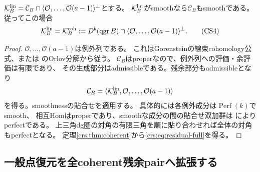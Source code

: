 \begin{proposition}[残余のsmoothnessから全線束部分へ]
\label{crs:prop:residual-smooth}
$\mathcal K_B^{\rm lin}=\mathcal C_B\cap
\langle\mathcal O,\ldots,\mathcal O(a-1)\rangle^\perp$とする。
$\mathcal K_B^{\rm lin}$がsmoothなら$\mathcal C_B$もsmoothである。
従ってこの場合
\[
 \mathcal K_B^{\rm lin}=\mathcal K_B^{\rm coh}:=
 D^b(\operatorname{qgr}B)\cap
 \langle\mathcal O,\ldots,\mathcal O(a-1)\rangle^\perp.
 \tag{CS4}\label{crs:eq:residual-full}
\]
\end{proposition}
\begin{proof}
$\mathcal O,\ldots,\mathcal O(a-1)$は例外列である。
これはGorensteinの線束cohomology公式、または
\cite[Theorem~6.4]{CRSBS}のOrlov分解から従う。
$\mathcal C_B$はproperなので、例外列への評価・余評価は有限であり、
その生成部分はadmissibleである。残余部分もadmissibleとなり
\[
 \mathcal C_B=\langle\mathcal K_B^{\rm lin},
                 \mathcal O,\ldots,\mathcal O(a-1)\rangle
\]
を得る。smoothnessの貼合せ\cite[Lemma~4.15(3)]{CRSPerry}を適用する。
具体的には各例外成分は$\operatorname{Perf}(k)$でsmooth、
相互Homはproperであり、smoothな成分の間の貼合せ双加群は
\cite[Lemma~2.8(2)]{CRSTV}によりperfectである。
上三角dg圏の対角の有限三角を順に貼り合わせれば全体の対角もperfectとなる。
定理\ref{crs:thm:coherent}から\eqref{crs:eq:residual-full}を得る。
\end{proof}

\subsection{一般点復元を全coherent残余pairへ拡張する}

